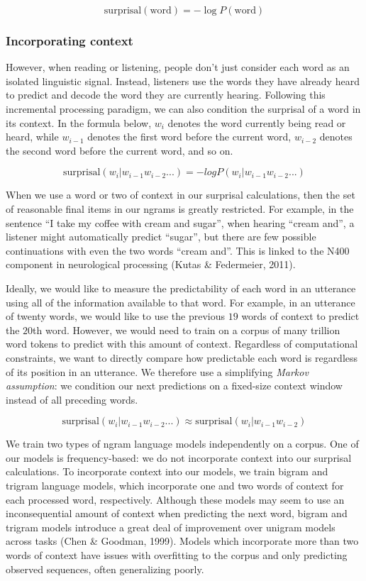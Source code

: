 \documentclass[10pt, letterpaper]{article}
\begin{document}
\[\text{surprisal}(\text{word}) = -\log P(\text{word})\]

\hypertarget{incorporating-context}{%
\subsubsection{Incorporating context}\label{incorporating-context}}

However, when reading or listening, people don't just consider each word
as an isolated linguistic signal. Instead, listeners use the words they
have already heard to predict and decode the word they are currently
hearing. Following this incremental processing paradigm, we can also
condition the surprisal of a word in its context. In the formula below,
\(w_i\) denotes the word currently being read or heard, while
\(w_{i-1}\) denotes the first word before the current word, \(w_{i-2}\)
denotes the second word before the current word, and so on.

\[\text{surprisal}(w_i|w_{i-1}w_{i-2}...) = -log P(w_i|w_{i-1}w_{i-2}...)\]

When we use a word or two of context in our surprisal calculations, then
the set of reasonable final items in our ngrams is greatly restricted.
For example, in the sentence ``I take my coffee with cream and sugar'',
when hearing ``cream and'', a listener might automatically predict
``sugar'', but there are few possible continuations with even the two
words ``cream and''. This is linked to the N400 component in
neurological processing (Kutas \& Federmeier, 2011).

Ideally, we would like to measure the predictability of each word in an
utterance using all of the information available to that word. For
example, in an utterance of twenty words, we would like to use the
previous \(19\) words of context to predict the \(20\)th word. However,
we would need to train on a corpus of many trillion word tokens to
predict with this amount of context. Regardless of computational
constraints, we want to directly compare how predictable each word is
regardless of its position in an utterance. We therefore use a
simplifying \emph{Markov assumption}: we condition our next predictions
on a fixed-size context window instead of all preceding words.

\[\text{surprisal}(w_i|w_{i-1}w_{i-2}...) \approx \text{surprisal}(w_i|w_{i-1}w_{i-2})\]

We train two types of ngram language models independently on a corpus.
One of our models is frequency-based: we do not incorporate context into
our surprisal calculations. To incorporate context into our models, we
train bigram and trigram language models, which incorporate one and two
words of context for each processed word, respectively. Although these
models may seem to use an inconsequential amount of context when
predicting the next word, bigram and trigram models introduce a great
deal of improvement over unigram models across tasks (Chen \& Goodman,
1999). Models which incorporate more than two words of context have
issues with overfitting to the corpus and only predicting observed
sequences, often generalizing poorly.
\end{document}
